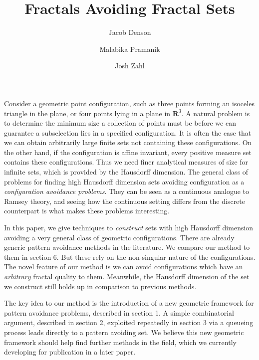 \documentclass{article}
\title{Fractals Avoiding Fractal Sets}
\author{Jacob Denson\\ \and Malabika Pramanik\\ \and Josh Zahl}
\theoremstyle{plain}
\theoremstyle{plain}
\begin{document}
\maketitle

\begin{multicols}{2}

\begin{abstract}
	\blindtext[1]
\end{abstract}


Consider a geometric point configuration, such as three points forming an isoceles triangle in the plane, or four points lying in a plane in $\mathbf{R}^3$. A natural problem is to determine the minimum size a collection of points must be before we can guarantee a subselection lies in a specified configuration. It is often the case that we can obtain arbitrarily large finite sets not containing these configurations. On the other hand, if the configuration is affine invariant, every positive measure set contains these configurations. Thus we need finer analytical measures of size for infinite sets, which is provided by the Hausdorff dimension. The general class of problems for finding high Hausdorff dimension sets avoiding configuration as a {\it configuration avoidance problems}. They can be seen as a continuous analogue to Ramsey theory, and seeing how the continuous setting differs from the discrete counterpart is what makes these problems interesting.

In this paper, we give techniques to {\it construct} sets with high Hausdorff dimension avoiding a very general class of geometric configurations. There are already generic pattern avoidance methods in the literature. We compare our method to them in section 6. But these rely on the non-singular nature of the configurations. The novel feature of our method is we can avoid configurations which have an {\it arbitrary} fractal quality to them. Meanwhile, the Hausdorff dimension of the set we construct still holds up in comparison to previous methods.

The key idea to our method is the introduction of a new geometric framework for pattern avoidance problems, described in section 1. A simple combinatorial argument, described in section 2, exploited repeatedly in section 3 via a queueing process leads directly to a pattern avoiding set. We believe this new geometric framework should help find further methods in the field, which we currently developing for publication in a later paper.


\end{multicols}
\end{document}
